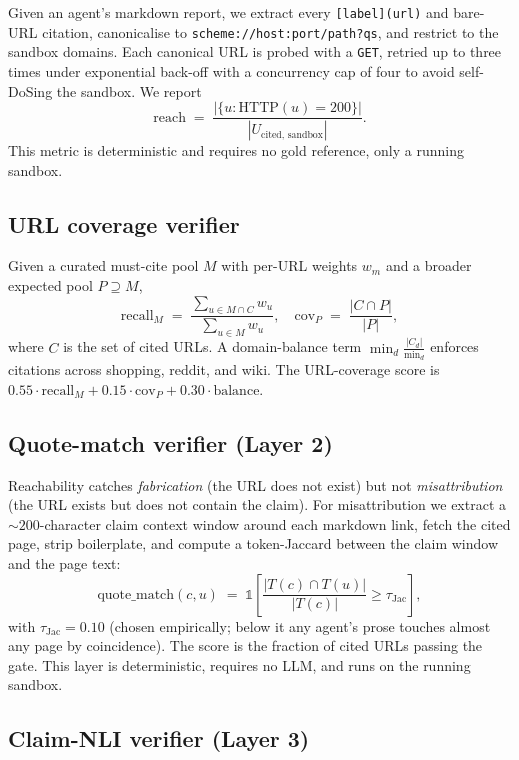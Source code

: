 \documentclass[11pt]{article}
\begin{document}
Given an agent's markdown report, we extract every \texttt{[label](url)} and
bare-URL citation, canonicalise to \texttt{scheme://host:port/path?qs}, and
restrict to the sandbox domains. Each canonical URL is probed with a
\texttt{GET}, retried up to three times under exponential back-off with a
concurrency cap of four to avoid self-DoSing the sandbox. We report
\[
  \mathrm{reach} \;=\; \frac{|\{u : \mathrm{HTTP}(u) = 200\}|}{|U_{\text{cited, sandbox}}|}.
\]
This metric is deterministic and requires no gold reference, only a
running sandbox.

\subsection{URL coverage verifier}
\label{sec:coverage}

Given a curated must-cite pool $M$ with per-URL weights $w_m$
and a broader expected pool $P \supseteq M$,
\[
  \mathrm{recall}_M \;=\;
  \frac{\sum_{u \in M \cap C} w_u}{\sum_{u \in M} w_u},
  \quad
  \mathrm{cov}_P \;=\;
  \frac{|C \cap P|}{|P|},
\]
where $C$ is the set of cited URLs. A domain-balance term
$\min_d \frac{|C_d|}{\text{min}_d}$ enforces citations across shopping,
reddit, and wiki. The URL-coverage score is
$0.55\cdot\mathrm{recall}_M + 0.15\cdot\mathrm{cov}_P + 0.30\cdot\mathrm{balance}$.

\subsection{Quote-match verifier (Layer 2)}
\label{sec:qmatch}

Reachability catches \emph{fabrication} (the URL does not exist) but
not \emph{misattribution} (the URL exists but does not contain the
claim). For misattribution we extract a $\sim 200$-character claim
context window around each markdown link, fetch the cited page,
strip boilerplate, and compute a token-Jaccard between the claim
window and the page text:
\[
  \mathrm{quote\_match}(c, u)
  \;=\;
  \mathbb{1}\!\left[\frac{|T(c) \cap T(u)|}{|T(c)|} \geq \tau_{\text{Jac}}\right],
\]
with $\tau_{\text{Jac}} = 0.10$ (chosen empirically; below it any
agent's prose touches almost any page by coincidence). The score is
the fraction of cited URLs passing the gate. This layer is
deterministic, requires no LLM, and runs on the running sandbox.

\subsection{Claim-NLI verifier (Layer 3)}
\label{sec:nli}
\end{document}
